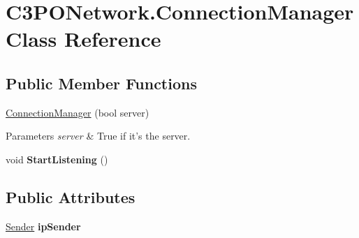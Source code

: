 \hypertarget{class_c3_p_o_network_1_1_connection_manager}{\section{C3\-P\-O\-Network.\-Connection\-Manager Class Reference}
\label{class_c3_p_o_network_1_1_connection_manager}
}
\subsection*{Public Member Functions}
\begin{DoxyCompactItemize}
\item 
\hypertarget{class_c3_p_o_network_1_1_connection_manager_a2026a318b98a184461de4a9aa89c9289}{\hyperlink{class_c3_p_o_network_1_1_connection_manager_a2026a318b98a184461de4a9aa89c9289}{Connection\-Manager} (bool server)}\label{class_c3_p_o_network_1_1_connection_manager_a2026a318b98a184461de4a9aa89c9289}

\begin{DoxyCompactList}\small\item\em 
\begin{DoxyParams}{Parameters}
{\em server} & True if it's the server.\\
\hline
\end{DoxyParams}
\end{DoxyCompactList}\item 
\hypertarget{class_c3_p_o_network_1_1_connection_manager_a3dd3ad5f5d3034638af383fbc678c149}{void {\bfseries Start\-Listening} ()}\label{class_c3_p_o_network_1_1_connection_manager_a3dd3ad5f5d3034638af383fbc678c149}

\end{DoxyCompactItemize}
\subsection*{Public Attributes}
\begin{DoxyCompactItemize}
\item 
\hypertarget{class_c3_p_o_network_1_1_connection_manager_a9b412f0e65ee7128a159450d8625f216}{\hyperlink{class_c3_p_o_network_1_1_sender}{Sender} {\bfseries ip\-Sender}}\label{class_c3_p_o_network_1_1_connection_manager_a9b412f0e65ee7128a159450d8625f216}

\end{DoxyCompactItemize}
